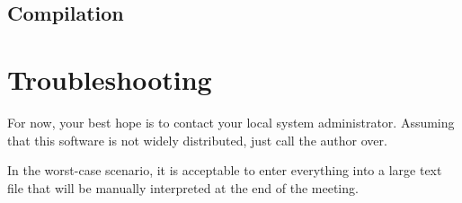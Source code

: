 \documentclass[12pt]{article}
\begin{document}
\subsection{Compilation}

\section{Troubleshooting}
For now, your best hope is to contact your local system administrator.
Assuming that this software is not widely distributed, just call the 
author over.

In the worst-case scenario, it is acceptable to enter everything into a large
text file that will be manually interpreted at the end of the meeting.
\end{document}
